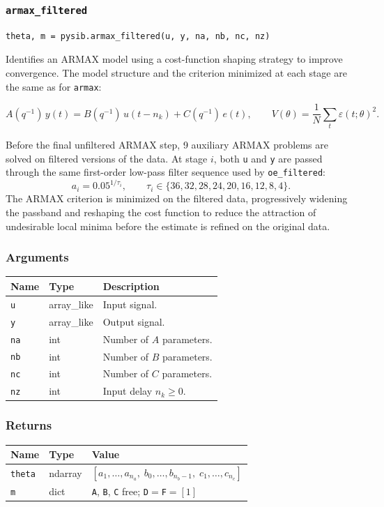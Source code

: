 \documentclass[../main]{subfiles}
\begin{document}
\newpage

\subsubsection{\texttt{armax\_filtered}}

\begin{lstlisting}
theta, m = pysib.armax_filtered(u, y, na, nb, nc, nz)
\end{lstlisting}

Identifies an ARMAX model using a cost-function shaping strategy to
improve convergence.  The model structure and the criterion minimized
at each stage are the same as for \texttt{armax}:

\[
  A(q^{-1})\,y(t) = B(q^{-1})\,u(t-n_k) + C(q^{-1})\,e(t), \qquad
  V(\theta) = \frac{1}{N}\sum_t \varepsilon(t;\theta)^2.
\]

Before the final unfiltered ARMAX step, 9 auxiliary ARMAX problems
are solved on filtered versions of the data.  At stage $i$, both
\texttt{u} and \texttt{y} are passed through the same first-order
low-pass filter sequence used by \texttt{oe\_filtered}:
\[
  a_i = 0.05^{1/\tau_i}, \qquad
  \tau_i \in \{36,32,28,24,20,16,12,8,4\}.
\]
The ARMAX criterion is
minimized on the filtered data, progressively widening the passband
and reshaping the cost function to reduce the attraction of
undesirable local minima before the estimate is refined on the
original data.

\subsubsection*{Arguments}
\begin{center}
\begin{tabular}{lll}
  \toprule
  Name & Type & Description \\
  \midrule
  \texttt{u}  & array\_like & Input signal. \\
  \texttt{y}  & array\_like & Output signal. \\
  \texttt{na} & int & Number of $A$ parameters. \\
  \texttt{nb} & int & Number of $B$ parameters. \\
  \texttt{nc} & int & Number of $C$ parameters. \\
  \texttt{nz} & int & Input delay $n_k \geq 0$. \\
  \bottomrule
\end{tabular}
\end{center}

\subsubsection*{Returns}
\begin{center}
\begin{tabular}{lll}
  \toprule
  Name & Type & Value \\
  \midrule
  \texttt{theta} & ndarray & $[a_1,\ldots,a_{n_a},\; b_0,\ldots,b_{n_b-1},\; c_1,\ldots,c_{n_c}]$ \\
  \texttt{m}     & dict    & \texttt{A}, \texttt{B}, \texttt{C} free; \texttt{D}$=$\texttt{F}$=[1]$ \\
  \bottomrule
\end{tabular}
\end{center}
\end{document}

